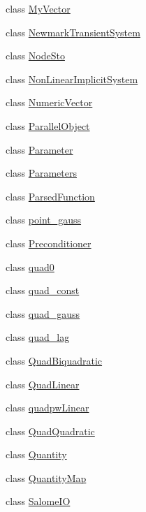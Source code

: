 \begin{DoxyCompactItemize}
\item 
class \mbox{\hyperlink{classfemus_1_1_my_vector}{My\+Vector}}
\item 
class \mbox{\hyperlink{classfemus_1_1_newmark_transient_system}{Newmark\+Transient\+System}}
\item 
class \mbox{\hyperlink{classfemus_1_1_node_sto}{Node\+Sto}}
\item 
class \mbox{\hyperlink{classfemus_1_1_non_linear_implicit_system}{Non\+Linear\+Implicit\+System}}
\item 
class \mbox{\hyperlink{classfemus_1_1_numeric_vector}{Numeric\+Vector}}
\item 
class \mbox{\hyperlink{classfemus_1_1_parallel_object}{Parallel\+Object}}
\item 
class \mbox{\hyperlink{classfemus_1_1_parameter}{Parameter}}
\item 
class \mbox{\hyperlink{classfemus_1_1_parameters}{Parameters}}
\item 
class \mbox{\hyperlink{classfemus_1_1_parsed_function}{Parsed\+Function}}
\item 
class \mbox{\hyperlink{classfemus_1_1point__gauss}{point\+\_\+gauss}}
\item 
class \mbox{\hyperlink{classfemus_1_1_preconditioner}{Preconditioner}}
\item 
class \mbox{\hyperlink{classfemus_1_1quad0}{quad0}}
\item 
class \mbox{\hyperlink{classfemus_1_1quad__const}{quad\+\_\+const}}
\item 
class \mbox{\hyperlink{classfemus_1_1quad__gauss}{quad\+\_\+gauss}}
\item 
class \mbox{\hyperlink{classfemus_1_1quad__lag}{quad\+\_\+lag}}
\item 
class \mbox{\hyperlink{classfemus_1_1_quad_biquadratic}{Quad\+Biquadratic}}
\item 
class \mbox{\hyperlink{classfemus_1_1_quad_linear}{Quad\+Linear}}
\item 
class \mbox{\hyperlink{classfemus_1_1quadpw_linear}{quadpw\+Linear}}
\item 
class \mbox{\hyperlink{classfemus_1_1_quad_quadratic}{Quad\+Quadratic}}
\item 
class \mbox{\hyperlink{classfemus_1_1_quantity}{Quantity}}
\item 
class \mbox{\hyperlink{classfemus_1_1_quantity_map}{Quantity\+Map}}
\item 
class \mbox{\hyperlink{classfemus_1_1_salome_i_o}{Salome\+IO}}
\item 

\end{DoxyCompactItemize}
